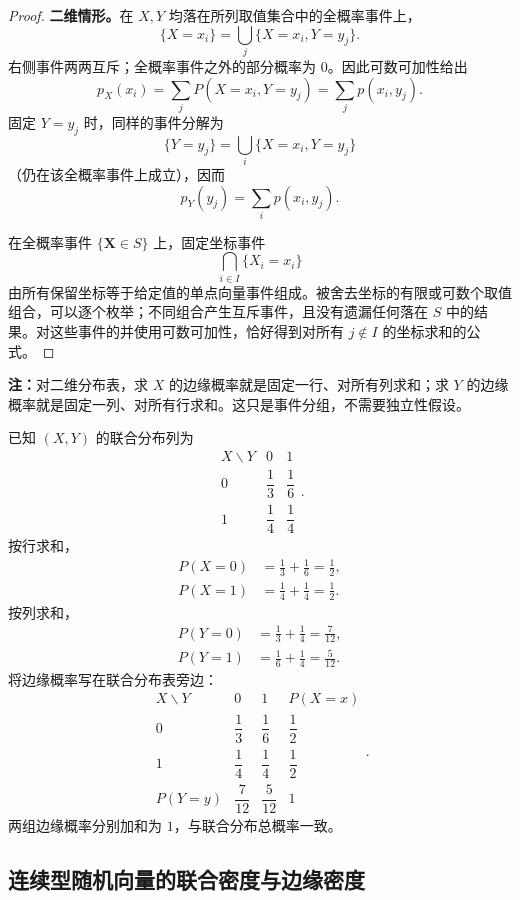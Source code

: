 \begin{proof}
\textbf{二维情形。}\quad 在 $X,Y$ 均落在所列取值集合中的全概率事件上，
\[
\{X=x_i\}=\bigcup_j\{X=x_i,Y=y_j\}.
\]
右侧事件两两互斥；全概率事件之外的部分概率为 $0$。因此可数可加性给出
\[
p_X(x_i)
=\sum_jP(X=x_i,Y=y_j)
=\sum_jp(x_i,y_j).
\]
固定 $Y=y_j$ 时，同样的事件分解为
\[
\{Y=y_j\}=\bigcup_i\{X=x_i,Y=y_j\}
\]
（仍在该全概率事件上成立），因而
\[
p_Y(y_j)=\sum_ip(x_i,y_j).
\]

在全概率事件 $\{\boldsymbol X\in S\}$ 上，固定坐标事件
\[
\bigcap_{i\in I}\{X_i=x_i\}
\]
由所有保留坐标等于给定值的单点向量事件组成。被舍去坐标的有限或可数个取值组合，可以逐个枚举；不同组合产生互斥事件，且没有遗漏任何落在 $S$ 中的结果。对这些事件的并使用可数可加性，恰好得到对所有 $j\notin I$ 的坐标求和的公式。
\end{proof}

\textbf{注：}\quad 对二维分布表，求 $X$ 的边缘概率就是固定一行、对所有列求和；求 $Y$ 的边缘概率就是固定一列、对所有行求和。这只是事件分组，不需要独立性假设。

\begin{example}[由联合分布表求边缘分布列]
已知 $(X,Y)$ 的联合分布列为
\[
\begin{array}{c|cc}
X\backslash Y&0&1\\ \hline
0&\dfrac13&\dfrac16\\[2pt]
1&\dfrac14&\dfrac14
\end{array}.
\]
按行求和，
\begin{align*}
P(X=0)&=\frac13+\frac16=\frac12,\\
P(X=1)&=\frac14+\frac14=\frac12.
\end{align*}
按列求和，
\begin{align*}
P(Y=0)&=\frac13+\frac14=\frac7{12},\\
P(Y=1)&=\frac16+\frac14=\frac5{12}.
\end{align*}
将边缘概率写在联合分布表旁边：
\[
\begin{array}{c|cc|c}
X\backslash Y&0&1&P(X=x)\\ \hline
0&\dfrac13&\dfrac16&\dfrac12\\[2pt]
1&\dfrac14&\dfrac14&\dfrac12\\[2pt] \hline
P(Y=y)&\dfrac7{12}&\dfrac5{12}&1
\end{array}.
\]
两组边缘概率分别加和为 $1$，与联合分布总概率一致。
\end{example}

\subsection*{连续型随机向量的联合密度与边缘密度}


